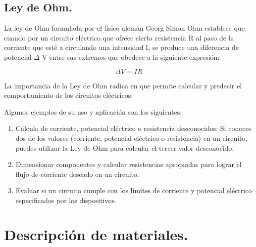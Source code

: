 \documentclass[10pt]{article}
\begin{document}
\begin{multicols}{2}
\subsection{Ley de Ohm.}

La ley de Ohm formulada por el físico alemán Georg Simon Ohm establece que cuando por un circuito eléctrico que ofrece cierta
resistencia R al paso de la corriente que esté a circulando una intensidad I, se produce
una diferencia de potencial $\Delta$ V entre sus extremos que obedece a la siguiente expresión:

\begin{equation}
	\Delta V = IR
\end{equation}

La importancia de la Ley de Ohm radica en que permite calcular y predecir el comportamiento de los circuitos eléctricos.

Algunos ejemplos de su uso y aplicación son los siguientes:

\begin{enumerate}
	\item Cálculo de corriente, potencial eléctrico o resistencia desconocidos: Si conoces dos de los valores (corriente, potencial eléctrico o resistencia) en un circuito, puedes utilizar la Ley de Ohm para calcular el tercer valor desconocido.
	\item Dimensionar componentes y calcular resistencias apropiadas para lograr el flujo de corriente deseado en un circuito.
	\item Evaluar si un circuito cumple con los límites de corriente y potencial eléctrico especificados por los dispositivos.
\end{enumerate}
\section{Descripción de materiales.}

\begin{center}


\end{center}
\end{multicols}
\end{document}
